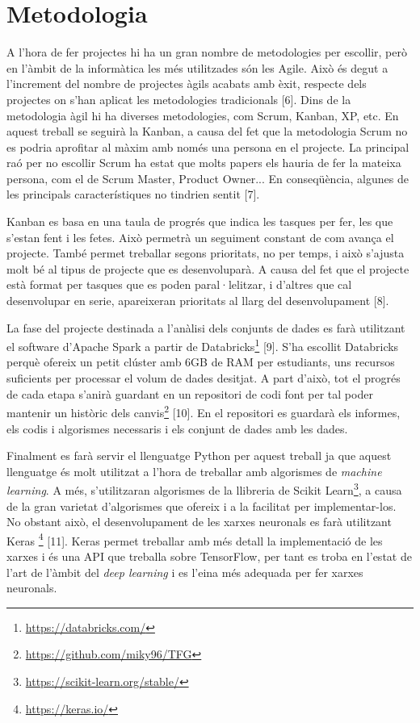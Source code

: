 \documentclass[10pt,a4paper,twocolumn,twoside]{article}
\begin{document}
\section {Metodologia}
A l'hora de fer projectes hi ha un gran nombre de metodologies per escollir, però en l'àmbit de la informàtica les més utilitzades són les Agile. Això és degut a l'increment del nombre de projectes àgils acabats amb èxit, respecte dels projectes on s'han aplicat les metodologies tradicionals [6]. Dins de la metodologia àgil hi ha diverses metodologies, com Scrum, Kanban, XP, etc. En aquest treball se seguirà la Kanban, a causa del fet que la metodologia Scrum no es podria aprofitar al màxim amb només una persona en el projecte. La principal raó per no escollir Scrum ha estat que molts papers els hauria de fer la mateixa persona, com el de Scrum Master, Product Owner... En conseqüència, algunes de les principals característiques no tindrien sentit [7].

Kanban es basa en una taula de progrés que indica les tasques per fer, les que s'estan fent i les fetes. Això permetrà un seguiment constant de com avança el projecte. També permet treballar segons prioritats, no per temps, i això s'ajusta molt bé al tipus de projecte que es desenvoluparà. A causa del fet que el projecte està format per tasques que es poden paral·lelitzar, i d'altres que cal desenvolupar en serie, apareixeran prioritats al llarg del desenvolupament [8].

La fase del projecte destinada a l'anàlisi dels conjunts de dades es farà utilitzant el software d'Apache Spark a partir de Databricks\footnote{\url{https://databricks.com/}} [9]. S'ha escollit Databricks perquè ofereix un petit clúster amb 6GB de RAM per estudiants, uns recursos suficients per processar el volum de dades desitjat.
A part d'això, tot el progrés de cada etapa s'anirà guardant en un repositori de codi font per tal poder mantenir un històric dels canvis\footnote{\url{ https://github.com/miky96/TFG}} [10]. En el repositori es guardarà els informes, els codis i algorismes necessaris i els conjunt de dades amb les dades.

Finalment es farà servir el llenguatge Python per aquest treball ja que aquest llenguatge és molt utilitzat a l'hora de treballar amb algorismes de \textit{machine learning}. A més, s'utilitzaran algorismes de la llibreria de Scikit Learn\footnote{\url{https://scikit-learn.org/stable/}}, a causa de la gran varietat d'algorismes que ofereix i a la facilitat per implementar-los. No obstant això, el desenvolupament de les xarxes neuronals es farà utilitzant Keras \footnote{\url{https://keras.io/}} [11]. Keras permet treballar amb més detall la implementació de les xarxes i és una API que treballa sobre TensorFlow, per tant es troba en l'estat de l'art de l'àmbit del \textit{deep learning} i es l'eina més adequada per fer xarxes neuronals.
\end{document}
